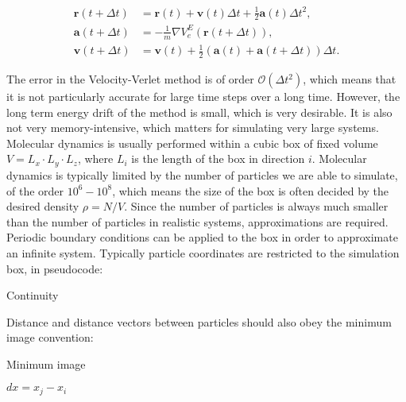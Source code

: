 \begin{equation}
    \begin{split}
        \bm{r}(t + \Delta t) 
        &= \bm{r}(t) + \bm{v}(t) \Delta t
        + \frac{1}{2} \bm{a}(t)\Delta t^2 , \\
        \bm{a}(t + \Delta t)
        &= -\frac{1}{m} \nabla V_e^E(\bm{r}(t + \Delta t)) , \\
        \bm{v}(t + \Delta t) 
        &= \bm{v}(t) + \frac{1}{2}
        (\bm{a}(t) + \bm{a}(t + \Delta t)) \Delta t .
    \end{split}
\end{equation}

The error in the Velocity-Verlet method is of order
$\mathcal{O}(\Delta t^2)$, which means that it is
not particularly accurate for large time steps
over a long time. However, the long term
energy drift of the method is small, which is very desirable.
It is also not very memory-intensive, which matters
for simulating very large systems.
\newline
\newline
Molecular dynamics is usually performed within
a cubic box of fixed volume $V = L_x \cdot L_y \cdot L_z$,
where $L_i$ is the length of the box in direction $i$.
Molecular dynamics is typically limited by the number
of particles we are able to simulate, of the order
$10^6 - 10^8$, which means the size of the box
is often decided by the desired density $\rho = N / V$.
Since the number of particles is always much smaller
than the number of particles in realistic systems,
approximations are required. Periodic boundary conditions
can be applied to the box in order to approximate
an infinite system. Typically particle coordinates are restricted
to the simulation box, in pseudocode:

\begin{algorithm}[H]
\caption{Continuity}
    \begin{algorithmic}
        \EndIf
        \EndIf
    \end{algorithmic}
\end{algorithm}

Distance and distance vectors between particles
should also obey the minimum image convention:

\begin{algorithm}[H]
\caption{Minimum image}
    \begin{algorithmic}
        \State $dx = x_j - x_i$
        \EndIf
        \EndIf
    \end{algorithmic}
\end{algorithm}

